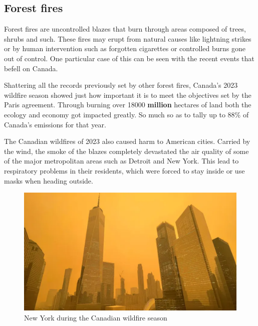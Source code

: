\documentclass[11pt]{article}
\begin{document}
\subsection{Forest fires}
Forest fires are uncontrolled blazes that burn through areas composed of trees, shrubs and such. These fires may erupt from natural causes like lightning strikes or by human intervention such as forgotten cigarettes or controlled burns gone out of control. One particular case of this can be seen with the recent events that befell on Canada. \par
\vspace{0.5 cm}
Shattering all the records previously set by other forest fires, Canada's 2023 wildfire season showed just how important it is to meet the objectives set by the Paris agreement. Through burning over 18000 \textbf{million} hectares of land both the ecology and economy got impacted greatly. So much so as to tally up to 88\% of Canada's emissions for that year. \par
\vspace{0.5 cm}

The Canadian wildfires of 2023 also caused harm to American cities. Carried by the wind, the smoke of the blazes completely devastated the air quality of some of the major metropolitan areas such as Detroit and New York. This lead to respiratory problems in their residents, which were forced to stay inside or use masks when heading outside. \par 
\vspace{0.5 cm}
\begin{figure}
    \centering
    \includegraphics[scale = 0.5]{New York.png}
    \caption{New York during the Canadian wildfire season}
    \label{fig:New York}
\end{figure}
\vspace{0.5 cm}
\end{document}
